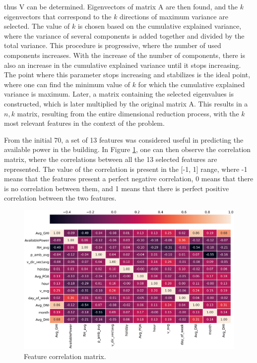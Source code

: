 thus V can be determined. Eigenvectors of matrix A are then found, and the $k$ eigenvectors that correspond to the $k$ directions of maximum variance are selected. The value of $k$ is chosen based on the cumulative explained variance, where the variance of several components is added together and divided by the total variance. This procedure is progressive, where the number of used components increases. With the increase of the number of components, there is also an increase in the cumulative explained variance until it stops increasing. The point where this parameter stops increasing and stabilizes is the ideal point, where one can find the minimum value of $k$ for which the cumulative explained variance is maximum. Later, a matrix containing the selected eigenvalues is constructed, which is later multiplied by the original matrix A. This results in a $n,k$ matrix, resulting from the entire dimensional reduction process, with the $k$ most relevant features in the context of the problem.

From the initial 70, a set of 13 features was considered useful in predicting the available power in the building. In Figure \ref{corr}, one can then observe the correlation matrix, where the correlations between all the 13 selected features are represented. The value of the correlation is present in the [-1, 1] range, where -1 means that the features present a perfect negative correlation, 0 means that there is no correlation between them, and 1 means that there is perfect positive correlation between the two features. 


\begin{figure}[h!]
    \centering
    \begin{center}
    \includegraphics[width=1\textwidth]{Images/corr1.PNG}
    \caption{Feature correlation matrix.}
    \label{corr}
    \end{center}
\end{figure}


